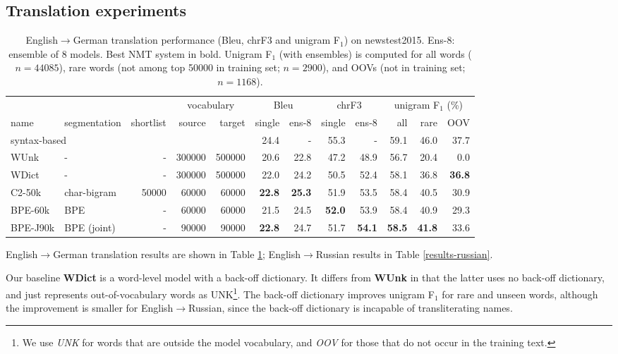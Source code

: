\documentclass[11pt]{article}
\begin{document}
\subsection{Translation experiments}

\begin{table}
\centering
\small
\setlength{\tabcolsep}{3pt}
\begin{tabular}{llrrr|rr|rr|rrr}
&&&\multicolumn{2}{c|}{vocabulary}&\multicolumn{2}{c|}{{\sc Bleu}} & \multicolumn{2}{c|}{{\sc chrF3}} & \multicolumn{3}{c}{unigram F$_1$ (\%)}\\
name & segmentation & shortlist & source & target & single & ens-8 & single & ens-8 & all & rare & OOV\\
\hline
\multicolumn{4}{l}{syntax-based \cite{sennrichhaddow15}} & & 
24.4 & - & 
55.3 & - & 59.1 & 46.0 & 37.7\\ 
\hline
WUnk & - & - & \num{300000} & \num{500000} & 
20.6 & 22.8 & 
47.2 & 48.9 & 56.7 & 20.4 & 0.0\\ 
WDict & - & - & \num{300000} & \num{500000} & 
22.0 & 24.2 & 
50.5 & 52.4 & 58.1 & 36.8 & \textbf{36.8}\\ 
C2-50k &char-bigram & \num{50000} & \num{60000} & \num{60000} & 
\textbf{22.8} & \textbf{25.3} & 
51.9 & 53.5 & 58.4 & 40.5 & 30.9 \\ 
BPE-60k &BPE & - & \num{60000} & \num{60000} & 
21.5 & 24.5 & 
\textbf{52.0} & 53.9 & 58.4 & 40.9 & 29.3\\ 
BPE-J90k &BPE (joint) & - & \num{90000} & \num{90000} & 
\textbf{22.8} & 24.7 & 
51.7 & \textbf{54.1} & \textbf{58.5} & \textbf{41.8} & 33.6\\ 
\end{tabular}
\caption{English$\to$German translation performance ({\sc Bleu}, {\sc chrF3} and unigram F$_1$) on newstest2015.
Ens-8: ensemble of 8 models.
Best NMT system in bold.
Unigram F$_1$ (with ensembles) is computed for all words ($n=44085$), rare words (not among top \num{50000} in training set; $n=2900$), and OOVs (not in training set; $n=1168$).}
\label{results}
\end{table}

English$\to$German translation results are shown in Table \ref{results};
English$\to$Russian results in Table \ref{results-russian}.

Our baseline \textbf{WDict} is a word-level model with a back-off dictionary.
It differs from \textbf{WUnk} in that the latter uses no back-off dictionary, and just represents out-of-vocabulary words as UNK\footnote{We use \emph{UNK} for words that are outside the model vocabulary, and \emph{OOV} for those that do not occur in the training text.}.
The back-off dictionary improves unigram F$_1$ for rare and unseen words, although the improvement is smaller for English$\to$Russian, since the back-off dictionary is incapable of transliterating names.
\end{document}
